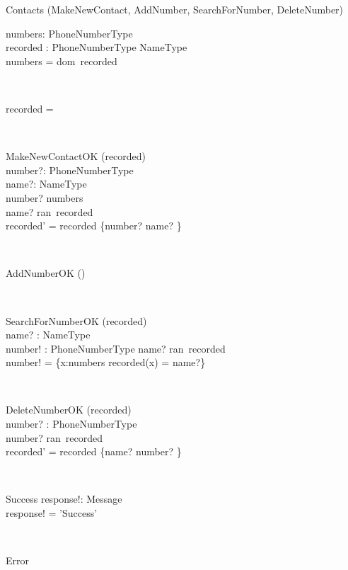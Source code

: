 \begin{class}{Contacts}
\also
\upharpoonright (MakeNewContact, AddNumber, SearchForNumber, DeleteNumber) \\
\begin{state}
numbers:  PhoneNumberType\\
recorded : PhoneNumberType \pfun NameType\\
\where
numbers = dom~recorded
\end{state} \\
\begin{init}
recorded = \emptyset %
\end{init} \\
\begin{op}{MakeNewContactOK}
\Delta (recorded) \\
number?: PhoneNumberType \\
name?: NameType \\
\ST
number? \notin numbers \\
name? \notin ran~recorded \\
recorded' = recorded \cup \{number? \mapsto name? \}
\end{op}\\
\begin{op}{AddNumberOK}
\Delta () \\
\ST
\end{op}\\
\begin{op}{SearchForNumberOK}
    \Xi (recorded) \\
    name? : NameType\\
    number! :  PhoneNumberType
    \ST
    name? \in ran~recorded\\
    number! = \{x:numbers  \mid recorded(x) = name?\}
\end{op}\\
\begin{op}{DeleteNumberOK}
\Delta (recorded) \\
number? : PhoneNumberType\\
\ST
number? \in ran~recorded\\
recorded' = recorded \ndres \{name? \mapsto number?  \}
\end{op}\\
\begin{op}{Success}
response!: Message \\
\ST
response! = 'Success'
\end{op}\\
\begin{op}{Error}

\end{op}
\end{class}
